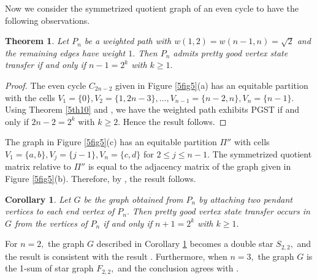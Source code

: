\documentclass[12pt,a4paper]{article}
\newtheorem{thm}{Theorem}
\newtheorem{cor}{Corollary}
\def \e {{\bf e}}
\def \e {{\mathbf e}}
\newcommand{\ob}[1]{\left(#1\right)}
\begin{document}
Now we consider the symmetrized quotient graph of an even cycle to have the following observations.
 \begin{thm}
    Let $P_n$ be a weighted path  with $w(1,2)=w(n-1,n)=\sqrt{2}$ and the remaining edges have weight $1.$ Then $P_n$ admits pretty good vertex state transfer if and only if $n-1=2^k$ with $k\geq 1.$
\end{thm}
\begin{proof}
    The even cycle $C_{2n-2}$ given in Figure \ref{5fig5}(a) has an equitable partition with the cells $V_1=\{0\},V_2=\{1, 2n-3\},\ldots,V_{n-1}=\{n-2,n\},V_{n}=\{n-1\}.$ Using Theorem \ref{5th10} and \cite[Remark 5]{god8}, we have the weighted path exhibits PGST if and only if $2n-2=2^k$ with $k\geq 2.$ Hence the result follows.
\end{proof}
  The graph in Figure \ref{5fig5}(c) has an equitable partition $\Pi''$ with cells $V_1=\{a,b\}, V_j=\{j-1\}, V_n=\{c,d\}$ for $2\leq j \leq n-1.$ The symmetrized quotient matrix relative to $\Pi''$ is equal to the adjacency matrix of the graph given in Figure \ref{5fig5}(b). Therefore, by \cite[Remark 5]{god8}, the result follows.
 \begin{cor}\label{5t31}
 Let $G$ be the graph obtained from $P_n$ by attaching two pendant vertices to each end vertex of $P_n.$ Then pretty good vertex state transfer occurs in $G$ from the vertices of 
 $P_n$ if and only if $n+1=2^k$ with $k\geq 1.$ 
 \end{cor}
For $n=2,$ the graph $G$ described in Corollary \ref{5t31} becomes a double star $S_{2,2},$ and the result is consistent with the result \cite[Theorem 5.3(b)]{fan}. Furthermore, when $n=3,$ the graph $G$ is the 1-sum of star graph $F_{2,2},$ and the conclusion agrees with \cite[Lemma 3.3]{hou}.
\end{document}
